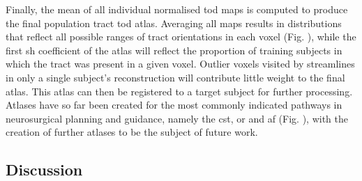Finally, the mean of all individual normalised \gls{tod} maps is computed to produce the final population tract \gls{tod} atlas.
Averaging all maps results in distributions that reflect all possible ranges of tract orientations in each voxel (Fig. ), while the first \gls{sh} coefficient of the atlas will reflect the proportion of training subjects in which the tract was present in a given voxel.
Outlier voxels visited by streamlines in only a single subject's reconstruction will contribute little weight to the final atlas.
This atlas can then be registered to a target subject for further processing.
Atlases have so far been created for the most commonly indicated pathways in neurosurgical planning and guidance, namely the \gls{cst}, \gls{or} and \gls{af} (Fig. ), with the creation of further atlases to be the subject of future work.

\subsection{Discussion}

